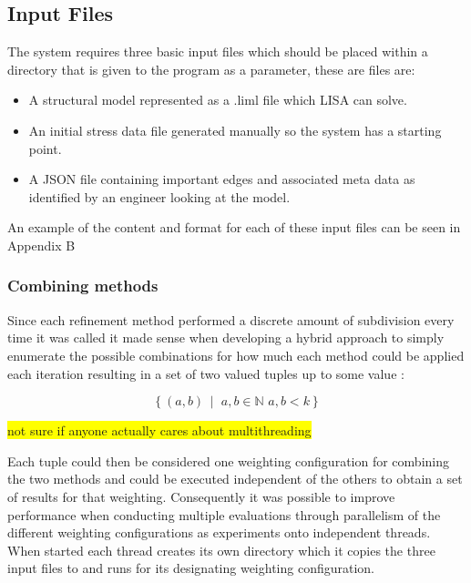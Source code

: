 \subsection{Input Files}
The system requires three basic input files which should be placed within a directory that is given to the program as a parameter, these are files are:

\begin{itemize}
\item A structural model represented as a .liml file which LISA can solve.
\item An initial stress data file generated manually so the system has a starting point.
\item A JSON file containing important edges and associated meta data as identified by an engineer looking at the model.
\end{itemize}

An example of the content and format for each of these input files can be seen in Appendix B



\subsubsection{Combining methods}
Since each refinement method performed a discrete amount of subdivision every time it was called it made sense when developing a hybrid approach to simply enumerate the possible combinations for how much each method could be applied each iteration resulting in a set of two valued tuples up to some value :

\[ \left\{ (a, b) \,\middle|\, \, a,b \in \mathbb{N}\, \, a,b < k \right\} \]


\colorbox{yellow}{not sure if anyone actually cares about multithreading}

\noindent
Each tuple could then be considered one weighting configuration for combining the two methods and could be executed independent of the others to obtain a set of results for that weighting. Consequently it was possible to improve performance when conducting multiple evaluations through parallelism of the different weighting configurations as experiments onto independent threads. When started each thread creates its own directory which it copies the three input files to and runs for its designating weighting configuration. 


